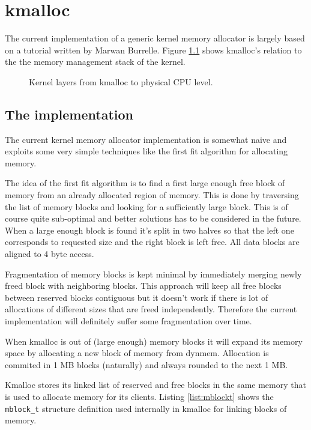 \chapter{kmalloc}

The current implementation of a generic kernel memory allocator is largely
based on a tutorial written by Marwan Burrelle\cite{Burelle:malloc}. Figure
\ref{figure:mm_layers} shows kmalloc's relation to the the memory management
stack of the kernel.

\begin{figure}
  
  \centering
  \caption{Kernel layers from kmalloc to physical \acs{CPU} level.}
  \label{figure:mm_layers}
\end{figure}

\section{The implementation}

The current kernel memory allocator implementation is somewhat naive and
exploits some very simple techniques like the first fit algorithm for allocating
memory.

The idea of the first fit algorithm is to find a first large enough free block
of memory from an already allocated region of memory. This is done by traversing
the list of memory blocks and looking for a sufficiently large block. This is
of course quite sub-optimal and better solutions has to be considered in the
future. When a large enough block is found it's split in two halves so that the
left one corresponds to requested size and the right block is left free. All data
blocks are aligned to 4 byte access.

Fragmentation of memory blocks is kept minimal by immediately merging newly freed
block with neighboring blocks. This approach will keep all free blocks between
reserved blocks contiguous but it doesn't work if there is lot of allocations of
different sizes that are freed independently. Therefore the current implementation
will definitely suffer some fragmentation over time.

When kmalloc is out of (large enough) memory blocks it will expand its memory
space by allocating a new block of memory from dynmem. Allocation is commited in
1 MB blocks (naturally) and always rounded to the next 1 MB.

Kmalloc stores its linked list of reserved and free blocks in the same memory
that is used to allocate memory for its clients. Listing \ref{list:mblockt}
shows the \verb+mblock_t+ structure definition used internally in kmalloc for
linking blocks of memory.

